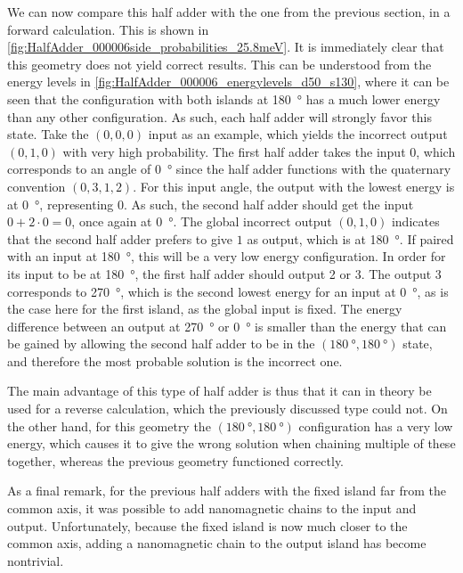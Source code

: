 \documentclass[11pt,a4paper,english]{article}
\begin{document}
We can now compare this half adder with the one from the previous section, in a forward calculation. This is shown in \cref{fig:HalfAdder_000006side_probabilities_25.8meV}. It is immediately clear that this geometry does not yield correct results. This can be understood from the energy levels in \cref{fig:HalfAdder_000006_energylevels_d50_s130}, where it can be seen that the configuration with both islands at \SI{180}{\degree} has a much lower energy than any other configuration. As such, each half adder will strongly favor this state. Take the $(0,0,0)$ input as an example, which yields the incorrect output $(0,1,0)$ with very high probability. The first half adder takes the input 0, which corresponds to an angle of \SI{0}{\degree} since the half adder functions with the quaternary convention $(0,3,1,2)$. For this input angle, the output with the lowest energy is at \SI{0}{\degree}, representing 0. As such, the second half adder should get the input $0+2\cdot0=0$, once again at \SI{0}{\degree}. The global incorrect output $(0,1,0)$ indicates that the second half adder prefers to give $1$ as output, which is at \SI{180}{\degree}. If paired with an input at \SI{180}{\degree}, this will be a very low energy configuration. In order for its input to be at \SI{180}{\degree}, the first half adder should output 2 or 3. The output 3 corresponds to \SI{270}{\degree}, which is the second lowest energy for an input at \SI{0}{\degree}, as is the case here for the first island, as the global input is fixed. The energy difference between an output at \SI{270}{\degree} or \SI{0}{\degree} is smaller than the energy that can be gained by allowing the second half adder to be in the $(\SI{180}{\degree}, \SI{180}{\degree})$ state, and therefore the most probable solution is the incorrect one. \par
The main advantage of this type of half adder is thus that it can in theory be used for a reverse calculation, which the previously discussed type could not. On the other hand, for this geometry the $(\SI{180}{\degree}, \SI{180}{\degree})$ configuration has a very low energy, which causes it to give the wrong solution when chaining multiple of these together, whereas the previous geometry functioned correctly.

As a final remark, for the previous half adders with the fixed island far from the common axis, it was possible to add nanomagnetic chains to the input and output. Unfortunately, because the fixed island is now much closer to the common axis, adding a nanomagnetic chain to the output island has become nontrivial.
\end{document}
